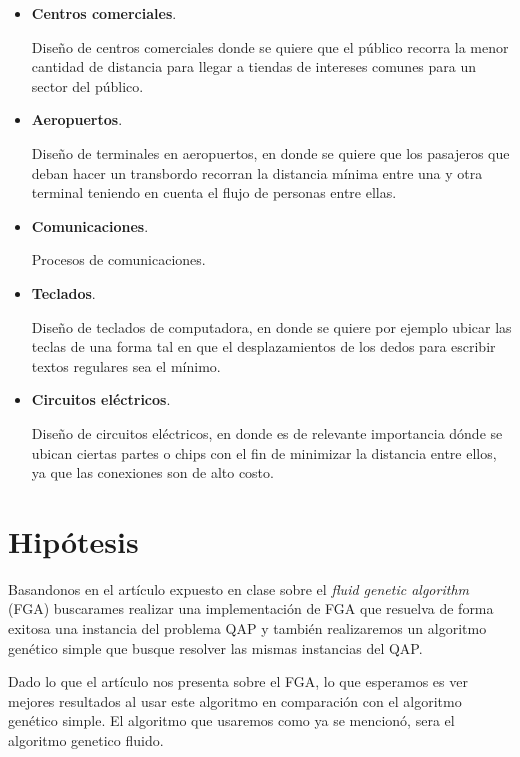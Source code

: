 \documentclass[12pts,letterpaper]{article}
\begin{document}
		\begin{itemize}
		
			\item \textbf{Centros comerciales}. 
			
				  Diseño de centros comerciales donde se quiere que el público 
				  recorra la menor cantidad de distancia para llegar a tiendas de intereses
				  comunes para un sector del público.

			\item \textbf{Aeropuertos}.
			
				  Diseño de terminales en aeropuertos, en donde se quiere que 
				  los pasajeros que deban hacer un transbordo recorran la 
				  distancia mínima entre una y otra terminal teniendo en cuenta 
				  el flujo de personas entre ellas.

			\item \textbf{Comunicaciones}.
			
				  Procesos de comunicaciones.

			\item \textbf{Teclados}.
			
				  Diseño de teclados de computadora, en donde se quiere por
				  ejemplo ubicar las teclas de una forma tal en que el desplazamientos
				  de los dedos para escribir textos regulares sea el mínimo.

			\item \textbf{Circuitos eléctricos}.
			
				  Diseño de circuitos eléctricos, en donde es de relevante importancia
				  dónde se ubican ciertas partes o chips con el fin de minimizar 
				  la distancia entre ellos, ya que las conexiones son de alto costo.
		
		\end{itemize}

	\section{Hipótesis}

		Basandonos en el artículo expuesto en clase sobre el \emph{fluid genetic algorithm}
		(FGA) buscarames realizar una implementación de FGA que resuelva de forma 
		exitosa una instancia del problema QAP y también realizaremos un 
		algoritmo genético simple que busque resolver las mismas instancias del 
		QAP.

		Dado lo que el artículo nos presenta sobre el FGA,
		lo que esperamos es ver mejores resultados al usar este algoritmo en comparación
		con el algoritmo genético simple. El algoritmo que usaremos como ya se mencionó,
		sera el algoritmo genetico fluido.
		
\end{document}
